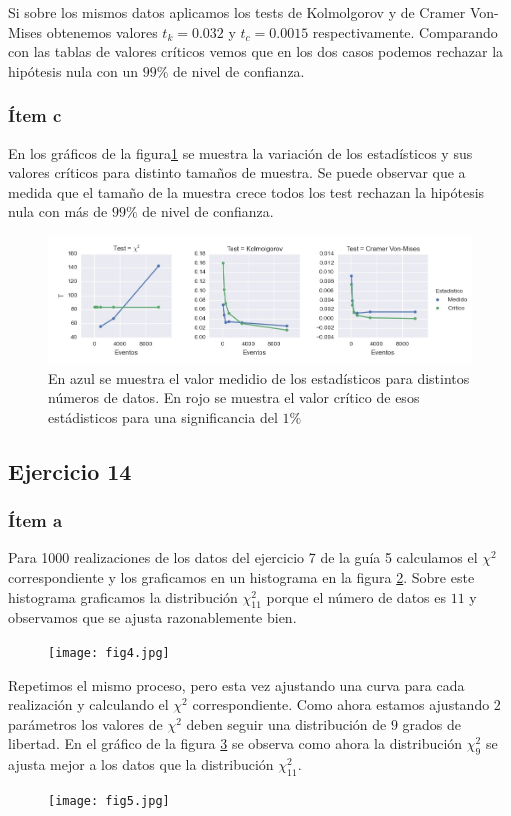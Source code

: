Si sobre los mismos datos aplicamos los tests de Kolmolgorov y de Cramer Von-Mises obtenemos valores $t_k=0.032$ y $t_c=0.0015$ respectivamente.
Comparando con las tablas de valores críticos vemos que en los dos casos podemos rechazar la hipótesis nula con un $99\%$ de nivel de confianza.

\subsubsection*{Ítem c}
En los gráficos de la figura\ref{fig:fig3} se muestra la variación de los estadísticos y sus valores críticos para distinto tamaños de muestra.
Se puede observar que a medida que el tamaño de la muestra crece todos los test rechazan la hipótesis nula con más de $99\%$ de nivel de confianza.

\begin{figure}
\centering
\includegraphics[width=\textwidth]{fig3.jpg}
\caption[]{En azul se muestra el valor medidio de los estadísticos para distintos números de datos. En rojo se muestra el valor crítico de esos estádisticos para una significancia del $1\%$}
\label{fig:fig3}
\end{figure}


\subsection*{Ejercicio 14}
\subsubsection*{Ítem a}
Para 1000 realizaciones de los datos del ejercicio 7 de la guía 5 calculamos el $\chi^2$ correspondiente y los graficamos en un histograma en la figura \ref{fig:fig4}.
Sobre este histograma graficamos la distribución $\chi^2_{11}$ porque el número de datos es $11$ y observamos que se ajusta razonablemente bien.

\begin{figure}
\centering
\texttt{[image: fig4.jpg]}
\caption[]{}
\label{fig:fig4}
\end{figure}


Repetimos el mismo proceso, pero esta vez ajustando una curva para cada realización y calculando el $\chi^2$ correspondiente.
Como ahora estamos ajustando $2$ parámetros los valores de $\chi^2$ deben seguir una distribución de $9$ grados de libertad.
En el gráfico de la figura \ref{fig:fig5} se observa como ahora la distribución $\chi^2_9$ se ajusta mejor a los datos que la distribución $\chi^2_{11}$.

\begin{figure}
\centering
\texttt{[image: fig5.jpg]}
\caption[]{}
\label{fig:fig5}
\end{figure}



